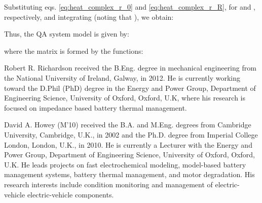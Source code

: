 \documentclass[journal, english]{IEEEtran}
\begin{document}
Substituting eqs. \ref{eq:heat_complex_r_0} and \ref{eq:heat_complex_r_R},
for  and , respectively, and integrating (noting
that ),
we obtain:

Thus, the QA system model is given by:

where the  matrix is formed by the functions:













\begin{IEEEbiography}
{Robert R. Richardson}
received the B.Eng. degree in mechanical engineering from the National University of Ireland, Galway, in 2012. He is currently working toward the D.Phil (PhD) degree in the Energy and Power Group, Department of Engineering Science, University of Oxford, Oxford, U.K, where his research is focused on impedance based battery thermal management.
\end{IEEEbiography}

\begin{IEEEbiography}
{David A. Howey}
(M\textquoteright{}10) received the B.A. and M.Eng. degrees from Cambridge University, Cambridge, U.K., in 2002 and the Ph.D. degree from Imperial College London, London, U.K., in 2010. He is currently a Lecturer with the Energy and Power Group, Department of Engineering Science, University of Oxford, Oxford, U.K. He leads projects on fast electrochemical modeling, model-based battery management systems, battery thermal management, and motor degradation. His research interests include condition monitoring and management of electric-vehicle electric-vehicle components.
\end{IEEEbiography}

\vfill
\end{document}
